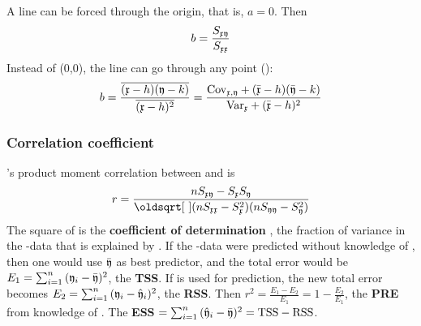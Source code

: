 \begin{refsection}
A line can be forced through the origin, that is, \(a = 0 \). Then
\begin{equation}
  b = \frac{S_{\mathfrak{xy}}}{S_{\mathfrak{xx}}}
\end{equation}
Instead of (0,0), the line can go through any point ():
\begin{equation}
  b = \frac{\overline{(\mathfrak{x} - h) (\mathfrak{y} - k)}}{\overline{(\mathfrak{x}-h)^2}}
    = \frac{\mathrm{Cov}_{\mathfrak{x,y}} + (\bar{\mathfrak{x}} - h) (\bar{\mathfrak{y}} - k)}{\mathrm{Var}_{\mathfrak{x}} + (\bar{\mathfrak{x}} - h)^2}
\end{equation}

\subsubsection{Correlation coefficient}

's product moment correlation between  and  is
\begin{equation}
 r = \frac{n S_\AbsVec{xy} - S_\AbsVec{x}S_\AbsVec{y}}{\sqrt{(n S_\AbsVec{xx} - S_\AbsVec{x}^2)(nS_\AbsVec{yy} - S_\AbsVec{y}^2)}}
\end{equation}
The square of  is the \textbf{coefficient of determination} , the fraction of variance in the -data that is explained by . If the  -data were predicted without knowledge of , then one would use \(\bar{\mathfrak{y}} \) as best predictor, and the total error would be \(E_1 = \sum_{i=1}^n{(\mathfrak{y}_i - \bar{\mathfrak{y}})^2} \), the \textbf{\acf{TSS}}. If  is used for prediction, the new total error becomes \(E_2 = \sum_{i=1}^n{(\mathfrak{y}_i - \hat{\mathfrak{y}}_i)^2} \), the \textbf{\acf{RSS}}. Then \(r^2 = \frac{E_1 - E_2}{E_1} = 1 - \frac{E_2}{E_1} \), the \textbf{\acf{PRE}} from knowledge of  \parencite{Fre-65}. The \textbf{\acf{ESS}} \( = \sum_{i=1}^n{(\hat{\mathfrak{y}}_i - \bar{\mathfrak{y}})^2} = \mathrm{TSS} - \mathrm{RSS} \).


\end{refsection}
